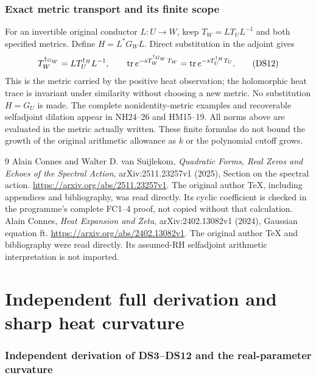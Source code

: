 \section{Exact metric transport and its finite scope}
For an invertible original conductor \(L:U\to W\), keep
\(T_W=LT_UL^{-1}\) and both specified metrics. Define
\(H=L^*G_WL\). Direct substitution in the adjoint gives
\[
 T_W^{\dagger_{G_W}}=L T_U^{\dagger_H}L^{-1},\qquad
 \operatorname{tr} e^{-sT_W^{\dagger_{G_W}}T_W}
 =\operatorname{tr} e^{-sT_U^{\dagger_H}T_U}.
 \tag{DS12}
\]
This is the metric carried by the positive heat observation; the
holomorphic heat trace is invariant under similarity without choosing
a new metric. No substitution \(H=G_U\) is made. The complete
nonidentity-metric examples and recoverable selfadjoint dilation appear
in NH24--26 and HM15--19. All norms above are evaluated in the metric
actually written. These finite formulas do not bound the growth of the
original arithmetic allowance as \(k\) or the polynomial cutoff grows.

\begin{thebibliography}{9}
 Alain Connes and Walter D. van Suijlekom,
\emph{Quadratic Forms, Real Zeros and Echoes of the Spectral Action},
arXiv:2511.23257v1 (2025), Section on the spectral action.
\url{https://arxiv.org/abs/2511.23257v1}.
The original author TeX, including appendices and bibliography, was
read directly. Its cyclic coefficient is checked in the programme's
complete FC1--4 proof, not copied without that calculation.
 Alain Connes, \emph{Heat Expansion and Zeta},
arXiv:2402.13082v1 (2024), Gaussian equation ft.
\url{https://arxiv.org/abs/2402.13082v1}.
The original author TeX and bibliography were read directly.
Its assumed-RH selfadjoint arithmetic interpretation is not imported.
\end{thebibliography}

\endgroup

\clearpage\begingroup
\part*{Independent full derivation and sharp heat curvature}
\providecommand{\nhitightlist}{\setlength{\itemsep}{0pt}\setlength{\parskip}{0pt}}
\providecommand{\nhipassthrough}[1]{#1}

\section{Independent derivation of DS3--DS12 and the real-parameter curvature}\label{nhi:independent-derivation-of-ds3ds12-and-the-real-parameter-curvature}

